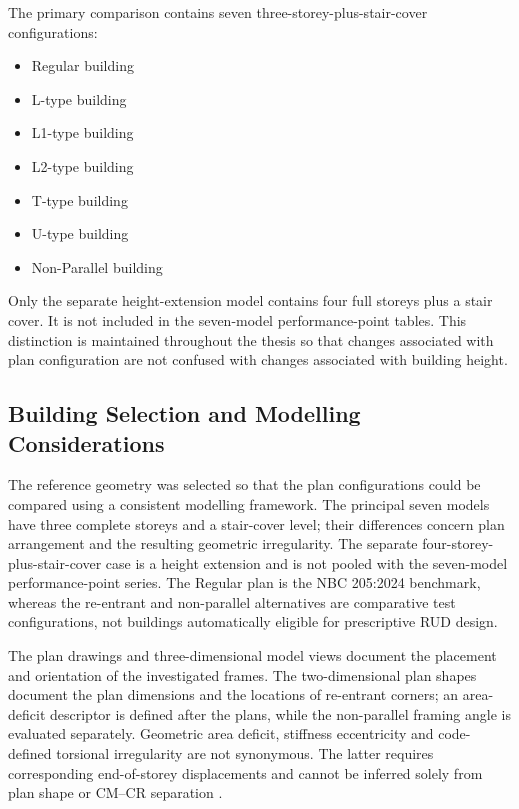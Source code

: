 The primary comparison contains seven three-storey-plus-stair-cover configurations:
\begin{itemize}[leftmargin=0.8cm,itemsep=0.15em,topsep=0.2em,parsep=0pt]
    \item Regular building
    \item L-type building
    \item L1-type building
    \item L2-type building
    \item T-type building
    \item U-type building
    \item Non-Parallel building
\end{itemize}
Only the separate height-extension model contains four full storeys plus a stair cover. It is not included in the seven-model performance-point tables. This distinction is maintained throughout the thesis so that changes associated with plan configuration are not confused with changes associated with building height.

\subsection{Building Selection and Modelling Considerations}
The reference geometry was selected so that the plan configurations could be compared using a consistent modelling framework. The principal seven models have three complete storeys and a stair-cover level; their differences concern plan arrangement and the resulting geometric irregularity. The separate four-storey-plus-stair-cover case is a height extension and is not pooled with the seven-model performance-point series. The Regular plan is the NBC 205:2024 benchmark, whereas the re-entrant and non-parallel alternatives are comparative test configurations, not buildings automatically eligible for prescriptive RUD design.

The plan drawings and three-dimensional model views document the placement and orientation of the investigated frames. The two-dimensional plan shapes document the plan dimensions and the locations of re-entrant corners; an area-deficit descriptor is defined after the plans, while the non-parallel framing angle is evaluated separately. Geometric area deficit, stiffness eccentricity and code-defined torsional irregularity are not synonymous. The latter requires corresponding end-of-storey displacements and cannot be inferred solely from plan shape or CM--CR separation \cite{nbc205_2024,nbc105_2025}.


